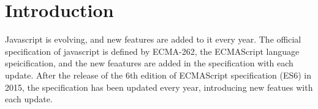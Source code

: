 \section{Introduction}\label{sec:intro}
%
%
%

% 

%
%
%



Javascript is evolving, and new features are added to it every year.
The official specification of javascript is defined by ECMA-262, the ECMAScript language speicification,
and the new feaatures are added in the specification with each update.
After the release of the 6th edition of ECMAScript specification (ES6) in 2015,
the specification has been updated every year, introducing new featues with each update.

